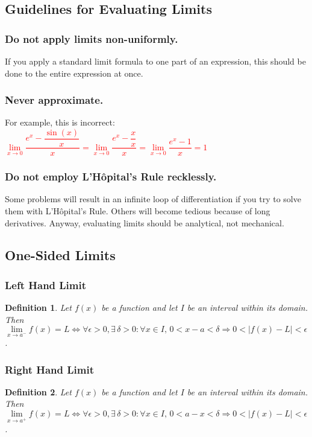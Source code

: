 \documentclass[14]{article}
\newtheorem{define}{Definition}
\begin{document}
\subsection{Guidelines for Evaluating Limits}
\subsubsection*{Do not apply limits non-uniformly.}
If you apply a standard limit formula to one part of an expression, this should be done to the entire expression at once.

\subsubsection*{Never approximate.}
For example, this is incorrect:\\
\textcolor{red}{$\lim\limits_{x \to 0} \dfrac{e^x - \dfrac{\sin(x)}{x}}{x} = \lim\limits_{x \to 0} \dfrac{e^x - \dfrac{x}{x}}{x} = \lim\limits_{x \to 0} \dfrac{e^x - 1}{x} = 1$}
\subsubsection*{Do not employ L'Hôpital's Rule recklessly.}
Some problems will result in an infinite loop of differentiation if you try to solve them with L'Hôpital's Rule. Others will become tedious because of long derivatives. Anyway, evaluating limits should be analytical, not mechanical.
\pagebreak
\subsection{One-Sided Limits}
\subsubsection{Left Hand Limit}
\begin{define}
Let $f(x)$ be a function and let $I$ be an interval within its domain.\\
Then $\lim\limits_{x \to a^-} f(x) = L \Leftrightarrow \forall \epsilon > 0, \exists \, \delta > 0 : \forall x \in I,\, 0 < x - a < \delta \Rightarrow 0 < |f(x) - L| < \epsilon$.
\end{define}
\subsubsection{Right Hand Limit}
\begin{define}
Let $f(x)$ be a function and let $I$ be an interval within its domain.\\
Then $\lim\limits_{x \to a^+} f(x) = L \Leftrightarrow \forall \epsilon > 0, \exists \, \delta > 0 : \forall x \in I,\, 0 < a - x < \delta \Rightarrow 0 < |f(x) - L| < \epsilon$.
\end{define}
\end{document}
